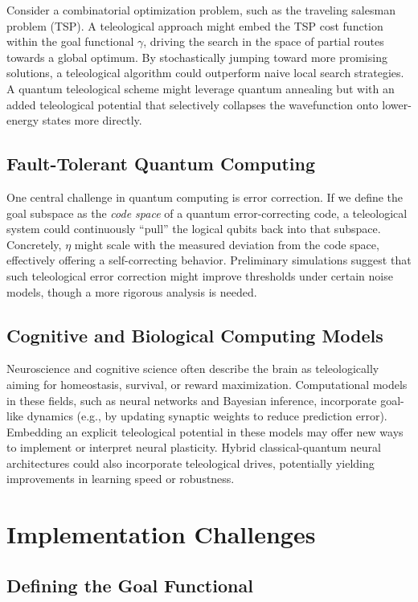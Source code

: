 \documentclass[12pt]{article}
\begin{document}
Consider a combinatorial optimization problem, such as the traveling salesman problem (TSP). A teleological approach might embed the TSP cost function within the goal functional $\gamma$, driving the search in the space of partial routes towards a global optimum. By stochastically jumping toward more promising solutions, a teleological algorithm could outperform naive local search strategies. A quantum teleological scheme might leverage quantum annealing but with an added teleological potential that selectively collapses the wavefunction onto lower-energy states more directly.

\subsection{Fault-Tolerant Quantum Computing}

One central challenge in quantum computing is error correction. If we define the goal subspace as the \emph{code space} of a quantum error-correcting code, a teleological system could continuously ``pull'' the logical qubits back into that subspace. Concretely, $\eta$ might scale with the measured deviation from the code space, effectively offering a self-correcting behavior. Preliminary simulations suggest that such teleological error correction might improve thresholds under certain noise models, though a more rigorous analysis is needed.

\subsection{Cognitive and Biological Computing Models}

Neuroscience and cognitive science often describe the brain as teleologically aiming for homeostasis, survival, or reward maximization. Computational models in these fields, such as neural networks and Bayesian inference, incorporate goal-like dynamics (e.g., by updating synaptic weights to reduce prediction error). Embedding an explicit teleological potential in these models may offer new ways to implement or interpret neural plasticity. Hybrid classical-quantum neural architectures could also incorporate teleological drives, potentially yielding improvements in learning speed or robustness.

\section{Implementation Challenges}

\subsection{Defining the Goal Functional}
\end{document}
